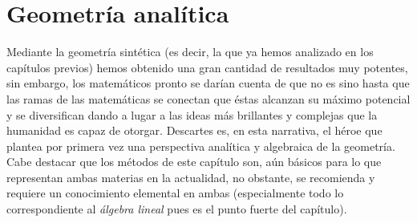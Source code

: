 \documentclass[11pt,a4paper]{book}
\begin{document}
\section{Geometría analítica}
Mediante la geometría sintética (es decir, la que ya hemos analizado en los capítulos previos) hemos obtenido una gran cantidad de resultados muy potentes, sin embargo, los matemáticos pronto se darían cuenta de que no es sino hasta que las ramas de las matemáticas se conectan que éstas alcanzan su máximo potencial y se diversifican dando a lugar a las ideas más brillantes y complejas que la humanidad es capaz de otorgar. Descartes es, en esta narrativa, el héroe que plantea por primera vez una perspectiva analítica y algebraica de la geometría. Cabe destacar que los métodos de este capítulo son, aún básicos para lo que representan ambas materias en la actualidad, no obstante, se recomienda y requiere un conocimiento elemental en ambas (especialmente todo lo correspondiente al \textit{álgebra lineal} pues es el punto fuerte del capítulo).
\end{document}
